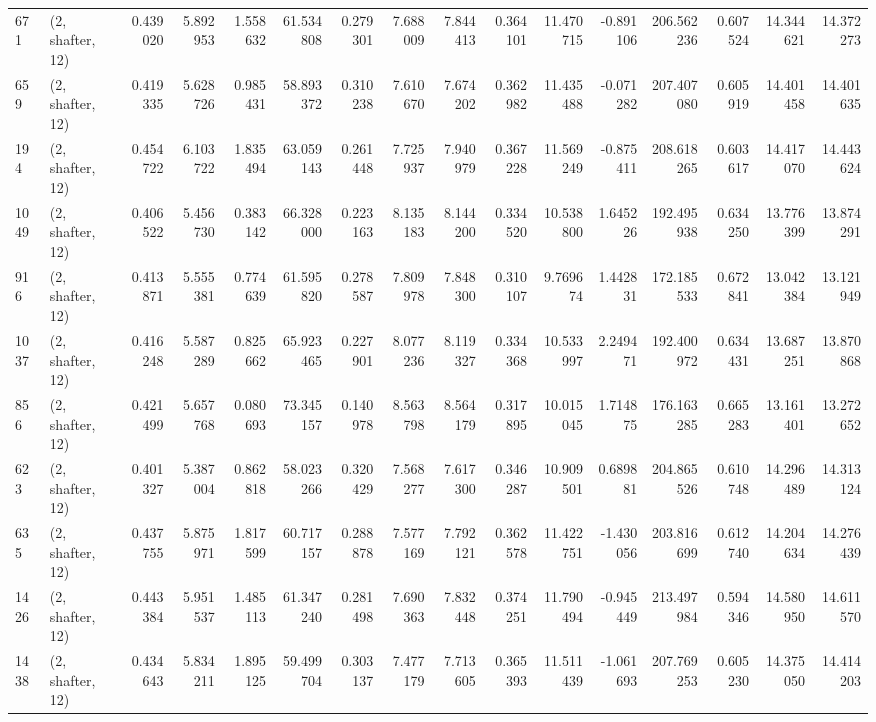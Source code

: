 \begin{tabular}{llrrrrrrrrrrrrrr}
671  &  (2, shafter, 12) &   0.439020 &   5.892953 &   1.558632 &     61.534808 &    0.279301 &    7.688009 &    7.844413 &  0.364101 &  11.470715 &  -0.891106 &   206.562236 &   0.607524 &  14.344621 &  14.372273 \\
659  &  (2, shafter, 12) &   0.419335 &   5.628726 &   0.985431 &     58.893372 &    0.310238 &    7.610670 &    7.674202 &  0.362982 &  11.435488 &  -0.071282 &   207.407080 &   0.605919 &  14.401458 &  14.401635 \\
194  &  (2, shafter, 12) &   0.454722 &   6.103722 &   1.835494 &     63.059143 &    0.261448 &    7.725937 &    7.940979 &  0.367228 &  11.569249 &  -0.875411 &   208.618265 &   0.603617 &  14.417070 &  14.443624 \\
1049 &  (2, shafter, 12) &   0.406522 &   5.456730 &   0.383142 &     66.328000 &    0.223163 &    8.135183 &    8.144200 &  0.334520 &  10.538800 &   1.645226 &   192.495938 &   0.634250 &  13.776399 &  13.874291 \\
916  &  (2, shafter, 12) &   0.413871 &   5.555381 &   0.774639 &     61.595820 &    0.278587 &    7.809978 &    7.848300 &  0.310107 &   9.769674 &   1.442831 &   172.185533 &   0.672841 &  13.042384 &  13.121949 \\
1037 &  (2, shafter, 12) &   0.416248 &   5.587289 &   0.825662 &     65.923465 &    0.227901 &    8.077236 &    8.119327 &  0.334368 &  10.533997 &   2.249471 &   192.400972 &   0.634431 &  13.687251 &  13.870868 \\
856  &  (2, shafter, 12) &   0.421499 &   5.657768 &   0.080693 &     73.345157 &    0.140978 &    8.563798 &    8.564179 &  0.317895 &  10.015045 &   1.714875 &   176.163285 &   0.665283 &  13.161401 &  13.272652 \\
623  &  (2, shafter, 12) &   0.401327 &   5.387004 &   0.862818 &     58.023266 &    0.320429 &    7.568277 &    7.617300 &  0.346287 &  10.909501 &   0.689881 &   204.865526 &   0.610748 &  14.296489 &  14.313124 \\
635  &  (2, shafter, 12) &   0.437755 &   5.875971 &   1.817599 &     60.717157 &    0.288878 &    7.577169 &    7.792121 &  0.362578 &  11.422751 &  -1.430056 &   203.816699 &   0.612740 &  14.204634 &  14.276439 \\
1426 &  (2, shafter, 12) &   0.443384 &   5.951537 &   1.485113 &     61.347240 &    0.281498 &    7.690363 &    7.832448 &  0.374251 &  11.790494 &  -0.945449 &   213.497984 &   0.594346 &  14.580950 &  14.611570 \\
1438 &  (2, shafter, 12) &   0.434643 &   5.834211 &   1.895125 &     59.499704 &    0.303137 &    7.477179 &    7.713605 &  0.365393 &  11.511439 &  -1.061693 &   207.769253 &   0.605230 &  14.375050 &  14.414203 \\

\end{tabular}
